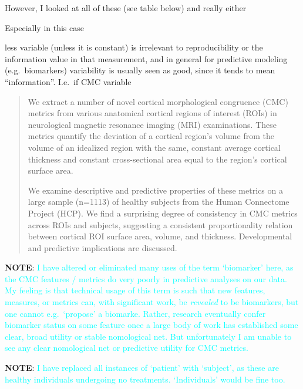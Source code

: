 \documentclass{article}
\newcommand{\note}[2][cyan]{\textbf{NOTE}: \textcolor{#1}{#2}}
\begin{document}
However, I looked at all of these (see table below) and really either

Especially in this case

less variable (unless it is constant) is irrelevant to reproducibility or the
information value in that measurement, and in general for predictive modeling
(e.g.\ biomarkers) variability is usually seen as good, since it tends to mean
``information''. I.e.\ if CMC variable

\color{black}






\begin{abstract}
We extract a number of novel cortical morphological congruence (CMC) metrics
from various anatomical cortical regions of interest (ROIs) in neurological
magnetic resonance imaging (MRI) examinations. These metrics quantify the
deviation of a cortical region's volume from the volume of an idealized
region with the same, constant average cortical thickness and constant
cross-sectional area equal to the region's cortical surface area.

We examine descriptive and predictive properties of these metrics on a large
sample (n=1113) of healthy subjects from the Human Connectome Project (HCP).
We find a surprising degree of consistency in CMC metrics across ROIs and
subjects, suggesting a consistent proportionality relation between cortical
ROI surface area, volume, and thickness. Developmental and predictive
implications are discussed.
\end{abstract}

\note{I have altered or eliminated many uses of the term `biomarker' here, as
the CMC features / metrics do very poorly in predictive analyses on our data.
My feeling is that technical usage of this term is such that new features,
measures, or metrics can, with significant work, be \emph{revealed} to be
biomarkers, but one cannot e.g.\ `propose' a biomarke. Rather, research
eventually confer biomarker status on some feature once a large body of work
has established some clear, broad utility or stable nomological net. But
unfortunately I am unable to see any clear nomological net or predictive
utility for CMC metrics.}

\note{I have replaced all instances of `patient' with `subject', as these are
healthy individuals undergoing no treatments. `Individuals' would be fine too.}


\end{document}
